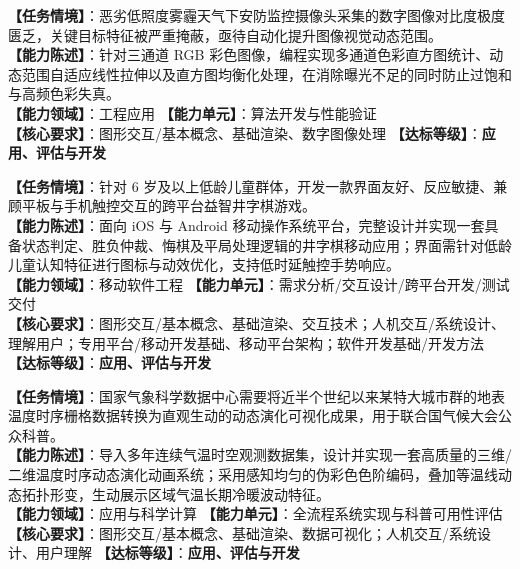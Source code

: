 \begin{taskbox}[任务 7：低对比度退化图像的自适应色彩直方图归一化增强]
\textbf{【任务情境】}：恶劣低照度雾霾天气下安防监控摄像头采集的数字图像对比度极度匮乏，关键目标特征被严重掩蔽，亟待自动化提升图像视觉动态范围。\\
\textbf{【能力陈述】}：针对三通道 RGB 彩色图像，编程实现多通道色彩直方图统计、动态范围自适应线性拉伸以及直方图均衡化处理，在消除曝光不足的同时防止过饱和与高频色彩失真。\\
\textbf{【能力领域】}：工程应用 \quad \textbf{【能力单元】}：算法开发与性能验证\\
\textbf{【核心要求】}：图形交互/基本概念、基础渲染、数字图像处理 \quad \textbf{【达标等级】}：\textbf{应用、评估与开发}
\end{taskbox}

\begin{taskbox}[任务 8：跨移动双平台的多人井字棋交互应用工程实现]
\textbf{【任务情境】}：针对 6 岁及以上低龄儿童群体，开发一款界面友好、反应敏捷、兼顾平板与手机触控交互的跨平台益智井字棋游戏。\\
\textbf{【能力陈述】}：面向 iOS 与 Android 移动操作系统平台，完整设计并实现一套具备状态判定、胜负仲裁、悔棋及平局处理逻辑的井字棋移动应用；界面需针对低龄儿童认知特征进行图标与动效优化，支持低时延触控手势响应。\\
\textbf{【能力领域】}：移动软件工程 \quad \textbf{【能力单元】}：需求分析/交互设计/跨平台开发/测试交付\\
\textbf{【核心要求】}：图形交互/基本概念、基础渲染、交互技术；人机交互/系统设计、理解用户；专用平台/移动开发基础、移动平台架构；软件开发基础/开发方法 \quad \textbf{【达标等级】}：\textbf{应用、评估与开发}
\end{taskbox}

\begin{taskbox}[任务 9：区域历史气象气温时空动态演化可视化系统]
\textbf{【任务情境】}：国家气象科学数据中心需要将近半个世纪以来某特大城市群的地表温度时序栅格数据转换为直观生动的动态演化可视化成果，用于联合国气候大会公众科普。\\
\textbf{【能力陈述】}：导入多年连续气温时空观测数据集，设计并实现一套高质量的三维/二维温度时序动态演化动画系统；采用感知均匀的伪彩色色阶编码，叠加等温线动态拓扑形变，生动展示区域气温长期冷暖波动特征。\\
\textbf{【能力领域】}：应用与科学计算 \quad \textbf{【能力单元】}：全流程系统实现与科普可用性评估\\
\textbf{【核心要求】}：图形交互/基本概念、基础渲染、数据可视化；人机交互/系统设计、用户理解 \quad \textbf{【达标等级】}：\textbf{应用、评估与开发}
\end{taskbox}

